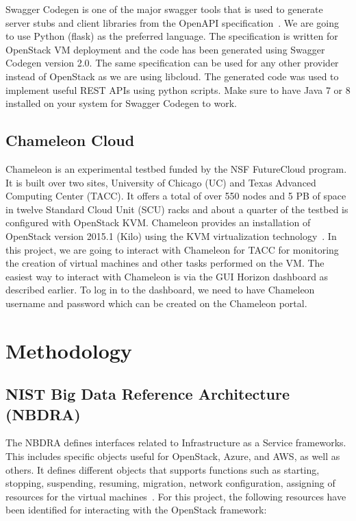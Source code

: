 Swagger Codegen is one of the major swagger tools that is used to generate
server stubs and client libraries from the OpenAPI
specification~\cite{hid-sp18-516-www-swagger}. We are going to use Python
(flask) as the preferred language. The specification is written for OpenStack 
VM deployment and the code has been generated using Swagger Codegen version 
2.0. The same specification can be used for any other provider instead of 
OpenStack as we are using libcloud. The generated code was used to implement 
useful REST APIs using python scripts. Make sure to have Java 7 or 8 installed 
on your system for Swagger Codegen to work. 

\subsection{Chameleon Cloud}
Chameleon is an experimental testbed funded by the NSF FutureCloud program. It
is built over two sites, University of Chicago (UC) and Texas Advanced
Computing Center (TACC). It offers a total of over 550 nodes and 5 PB of space
in twelve Standard Cloud Unit (SCU) racks and about a quarter of the testbed 
is configured with OpenStack KVM. Chameleon provides an installation of 
OpenStack version 2015.1 (Kilo) using the KVM virtualization
technology~\cite{hid-sp18-516-las-handbook}. In this project, we are going to
interact with Chameleon for TACC for monitoring the creation of virtual 
machines and other tasks performed on the VM. The easiest way to interact 
with Chameleon is via the GUI Horizon dashboard as described earlier. To log 
in to the dashboard, we need to have Chameleon username and password which can 
be created on the Chameleon portal. 

\section{Methodology}

\subsection{NIST Big Data Reference Architecture (NBDRA)}
The NBDRA defines interfaces related to Infrastructure as a Service frameworks.
This includes specific objects useful for OpenStack, Azure, and AWS, as well as
others. It defines different objects that supports functions such as starting,
stopping, suspending, resuming, migration, network configuration, assigning of
resources for the virtual machines~\cite{hid-sp18-516-nist-vol8}. For this
project, the following resources have been identified for interacting with the
OpenStack framework:

